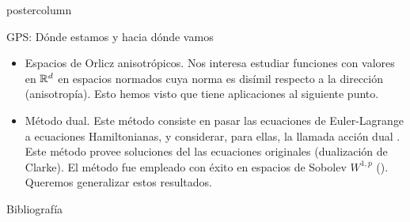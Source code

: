 \documentclass[final,hyperref={pdfpagelabels=false}]{beamer}
\begin{document}
\begin{frame}
\begin{columns}
\begin{column}{.49\textwidth}
\begin{beamercolorbox}[center,wd=\textwidth]{postercolumn}
\begin{minipage}[T]{.95\textwidth}
{\begin{block}{GPS: Dónde estamos y hacia dónde vamos}
\begin{minipage}[T]{.9\textwidth}
\begin{itemize}
\item Espacios de Orlicz anisotrópicos. Nos interesa estudiar funciones con valores en $\mathbb{R}^d$  en espacios normados cuya norma es disímil respecto a la dirección  (anisotropía). Esto hemos visto que tiene aplicaciones al siguiente punto.
\item Método dual. Este método consiste en pasar las ecuaciones de Euler-Lagrange a ecuaciones Hamiltonianas, y considerar, para ellas, la llamada acción dual . Este método provee soluciones del las ecuaciones originales (dualización de Clarke). El método fue empleado con éxito  en espacios de Sobolev $W^{1,p}$ (\cite{Tian2007192}). Queremos generalizar estos resultados.

\end{itemize}
\end{minipage}
\end{block}





           
\begin{block}{Bibliografía}
  
 
\end{block}




                      \vfill

          }
        \end{minipage}
      \end{beamercolorbox}
    \end{column}
  \end{columns}

\end{frame}
\end{document}
